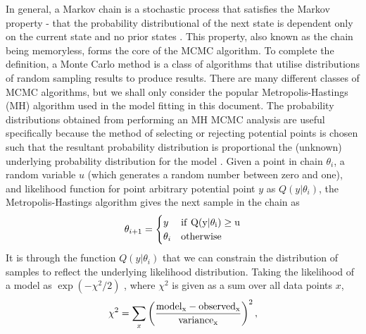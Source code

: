 \documentclass[titlesmallcaps, examinerscopy, copyrightpage]{uqthesis}
\begin{document}
In general, a Markov chain is a stochastic process that satisfies the Markov property - that the probability distributional of the next state is dependent only on the current state and no prior states \citep{Markov1988theory}. This property, also known as the chain being memoryless, forms the core of the MCMC algorithm. To complete the definition, a Monte Carlo method is a class of algorithms that utilise distributions of random sampling results to produce results. There are many different classes of MCMC algorithms, but we shall only consider the popular Metropolis-Hastings (MH) algorithm used in the model fitting in this document. The probability distributions obtained from performing an MH MCMC analysis are useful specifically because the method of selecting or rejecting potential points is chosen such that the resultant probability distribution is proportional the (unknown) underlying probability distribution for the model \citep{Hobson2010bayesian, Ivezic2013}. Given a point in chain $\theta_i$, a random variable $u$ (which generates a random number between zero and one), and likelihood function for point arbitrary potential point $y$  as $Q(y|\theta_i)$, the Metropolis-Hastings algorithm gives the next sample in the chain as 
\begin{align}
\theta_{i+1} = \begin{cases}
y & \rm{if } \ Q(y|\theta_i) \geq u \\
\theta_i & \rm{otherwise}
\end{cases}
\end{align}
It is through the function $Q(y|\theta_i)$ that we can constrain the distribution of samples to reflect the underlying likelihood distribution. Taking the likelihood of a model as $\exp(-\chi^2 / 2)$ \citep{Press1992}, where $\chi^2$ is given as a sum over all data points $x$,
\begin{align}
\chi^2 = \sum_x \left(\frac{\rm{model}_x - \rm{observed}_x}{\rm{variance}_x}\right)^2,
\end{align}
\end{document}
